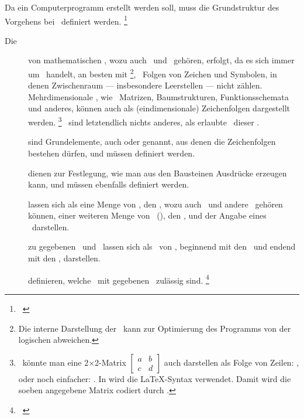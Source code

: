Da ein Computerprogramm erstellt werden soll, muss die Grundstruktur des Vorgehens bei \Beweisen\ definiert werden.%
\footnote{\seename~\cite{bib:Kalkuel}}

\begin{description}
	\item[Die \logischeDarstellung] von mathematischen \Aussagen, wozu auch \Axiome\ und \Saetze\ gehören, erfolgt, da es sich immer um \Formeln\ handelt, an besten mit \Zeichenfolgen%
	\footnote{%
		Die interne Darstellung der \Zeichenfolgen\ kann zur Optimierung des Programms von der logischen abweichen.
	},
	\textdh\ Folgen von Zeichen und Symbolen, in denen Zwischenraum --- insbesondere Leerstellen --- nicht zählen.
	Mehrdimensionale \Formeln, wie \textzB\ Matrizen, Baumstrukturen, Funktionsschemata und anderes, können auch als (eindimensionale) Zeichenfolgen dargestellt werden.%
	\footnote{%
		\textZB\ könnte man eine 2$\times$2-Matrix
		$\begin{bmatrix} a & b \\ c & d \end{bmatrix}$
		auch darstellen als Folge von Zeilen: \seqqt{$[(a,b),(c,d)]$}, oder noch einfacher: \seqqt{$[a,b;c,d]$}.
		In \ASBA wird die \LaTeX-Syntax verwendet.
		Damit wird die soeben angegebene Matrix codiert durch .
	}
	\Beweise\ sind letztendlich nichts anderes, als erlaubte \Umwandlungen\ dieser \Zeichenfolgen.
	\item[\Bausteine] sind Grundelemente, auch  oder  genannt, aus denen die Zeichenfolgen bestehen dürfen, und müssen definiert werden.
	\item[\Formationsregeln] dienen zur Festlegung, wie man aus den Bausteinen Ausdrücke erzeugen kann, und müssen ebenfalls definiert werden.
	\item[\Saetze] lassen sich als eine Menge von \Formeln, den \Voraussetzungen, wozu auch \Axiome\ und andere \Saetze\ gehören können, einer weiteren Menge von \Formeln\ (\Zeichenfolgen), den \Folgerungen, und der Angabe eines \Beweises\ darstellen.
	\item[\Beweise] zu gegebenen \Voraussetzungen\ und \Folgerungen\ lassen sich als \Folge\ von \Umwandlungen, beginnend mit den \Voraussetzungen\ und endend mit den \Folgerungen, darstellen.
	\item[\Umwandlungsregeln] definieren, welche \Umwandlungen\ mit gegebenen \Formelmengen\ zulässig sind.%
	\footnote{\seename~\cite{bib:Rautenberg,bib:Schlussregel,bib:NatuerlichesSchliessen}}
\end{description}

\Endchapter
